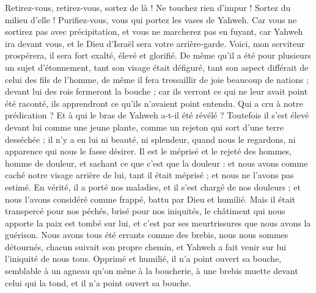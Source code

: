 \begin{multicols}{2}
Retirez-vous, retirez-vous, sortez de là ! Ne touchez rien d'impur ! Sortez du milieu d'elle ! Purifiez-vous, vous qui portez les vases de Yahweh.
Car vous ne sortirez pas avec précipitation, et vous ne marcherez pas en fuyant, car Yahweh ira devant vous, et le Dieu d'Israël sera votre arrière-garde.
Voici, mon serviteur prospérera, il sera fort exalté, élevé et glorifié.
De même qu'il a été pour plusieurs un sujet d'étonnement, tant son visage était défiguré, tant son aspect différait de celui des fils de l'homme,
de même il fera tressaillir de joie beaucoup de nations ; devant lui des rois fermeront la bouche ; car ils verront ce qui ne leur avait point été raconté, ils apprendront ce qu'ils n'avaient point entendu.
\VerseOne{}Qui a cru à notre prédication ? Et à qui le bras de Yahweh a-t-il été révélé ?
Toutefois il s'est élevé devant lui comme une jeune plante, comme un rejeton qui sort d'une terre desséchée ; il n'y a en lui ni beauté, ni splendeur, quand nous le regardons, ni apparence qui nous le fasse désirer.
Il est le méprisé et le rejeté des hommes, homme de douleur, et sachant ce que c'est que la douleur : et nous avons comme caché notre visage arrière de lui, tant il était méprisé ; et nous ne l'avons pas estimé.
En vérité, il a porté nos maladies, et il s'est chargé de nos douleurs ; et nous l'avons considéré comme frappé, battu par Dieu et humilié.
Mais il était transpercé pour nos péchés, brisé pour nos iniquités, le châtiment qui nous apporte la paix est tombé sur lui, et c'est par ses meurtrissures que nous avons la guérison.
Nous avons tous été errants comme des brebis, nous nous sommes détournés, chacun suivait son propre chemin, et Yahweh a fait venir sur lui l'iniquité de nous tous.
Opprimé et humilié, il n'a point ouvert sa bouche, semblable à un agneau qu'on mène à la boucherie, à une brebis muette devant celui qui la tond, et il n'a point ouvert sa bouche.

\end{multicols}
